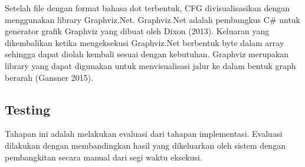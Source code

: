 Setelah file dengan format bahasa dot terbentuk, CFG divisualisasikan dengan menggunakan library Graphviz.Net. Graphviz.Net adalah pembungkus C# untuk generator grafik Graphviz yang dibuat oleh Dixon (2013). Keluaran yang dikembalikan ketika mengeksekusi Graphviz.Net berbentuk byte dalam array sehingga dapat diolah kembali sesuai dengan kebutuhan. Graphviz merupakan library yang dapat digunakan untuk menvisualisasi jalur ke dalam bentuk graph berarah (Gansner 2015). 


\subsection*{Testing}

Tahapan ini adalah melakukan evaluasi dari tahapan implementasi. Evaluasi dilakukan dengan membandingkan hasil yang dikeluarkan oleh sistem dengan pembangkitan secara manual dari segi waktu eksekusi. 
